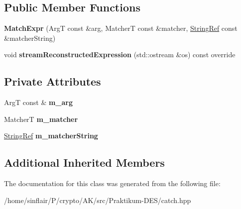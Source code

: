 \subsection*{Public Member Functions}
\begin{DoxyCompactItemize}
\item 
\mbox{\label{classCatch_1_1MatchExpr_ae55ee9bf46c8676c65e9df291a98c345}} 
{\bfseries Match\+Expr} (ArgT const \&arg, MatcherT const \&matcher, \hyperlink{classCatch_1_1StringRef}{String\+Ref} const \&matcher\+String)
\item 
\mbox{\label{classCatch_1_1MatchExpr_ad3e41adb597750b2219bb37e51185629}} 
void {\bfseries stream\+Reconstructed\+Expression} (std\+::ostream \&os) const override
\end{DoxyCompactItemize}
\subsection*{Private Attributes}
\begin{DoxyCompactItemize}
\item 
\mbox{\label{classCatch_1_1MatchExpr_afb77e2fbf49f956d27f8617a70cf7118}} 
ArgT const  \& {\bfseries m\+\_\+arg}
\item 
\mbox{\label{classCatch_1_1MatchExpr_a4dea78586dd2b3268b4a186e7c0adbe2}} 
MatcherT {\bfseries m\+\_\+matcher}
\item 
\mbox{\label{classCatch_1_1MatchExpr_a33ec706994f744ff1f4a549177ec08f9}} 
\hyperlink{classCatch_1_1StringRef}{String\+Ref} {\bfseries m\+\_\+matcher\+String}
\end{DoxyCompactItemize}
\subsection*{Additional Inherited Members}


The documentation for this class was generated from the following file\+:\begin{DoxyCompactItemize}
\item 
/home/sinflair/\+P/crypto/\+A\+K/src/\+Praktikum-\/\+D\+E\+S/catch.\+hpp\end{DoxyCompactItemize}
